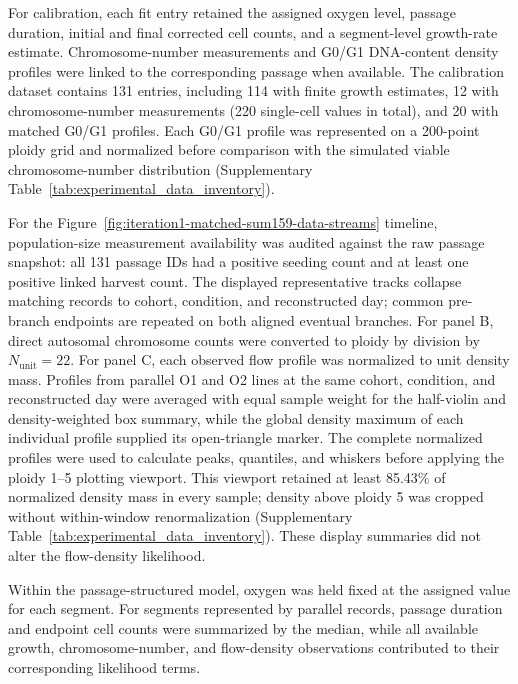 \documentclass[11pt]{article}
\begin{document}
For calibration, each fit entry retained the assigned oxygen level, passage duration, initial and final corrected cell counts, and a segment-level growth-rate estimate. Chromosome-number measurements and G0/G1 DNA-content density profiles were linked to the corresponding passage when available. The calibration dataset contains 131 entries, including 114 with finite growth estimates, 12 with chromosome-number measurements (220 single-cell values in total), and 20 with matched G0/G1 profiles. Each G0/G1 profile was represented on a 200-point ploidy grid and normalized before comparison with the simulated viable chromosome-number distribution (Supplementary Table~\ref{tab:experimental_data_inventory}).

For the Figure~\ref{fig:iteration1-matched-sum159-data-streams} timeline, population-size measurement availability was audited against the raw passage snapshot: all 131 passage IDs had a positive seeding count and at least one positive linked harvest count. The displayed representative tracks collapse matching records to cohort, condition, and reconstructed day; common pre-branch endpoints are repeated on both aligned eventual branches. For panel B, direct autosomal chromosome counts were converted to ploidy by division by $N_{\mathrm{unit}}=22$. For panel C, each observed flow profile was normalized to unit density mass. Profiles from parallel O1 and O2 lines at the same cohort, condition, and reconstructed day were averaged with equal sample weight for the half-violin and density-weighted box summary, while the global density maximum of each individual profile supplied its open-triangle marker. The complete normalized profiles were used to calculate peaks, quantiles, and whiskers before applying the ploidy 1--5 plotting viewport. This viewport retained at least 85.43\% of normalized density mass in every sample; density above ploidy 5 was cropped without within-window renormalization (Supplementary Table~\ref{tab:experimental_data_inventory}). These display summaries did not alter the flow-density likelihood.

Within the passage-structured model, oxygen was held fixed at the assigned value for each segment. For segments represented by parallel records, passage duration and endpoint cell counts were summarized by the median, while all available growth, chromosome-number, and flow-density observations contributed to their corresponding likelihood terms.



\end{document}
